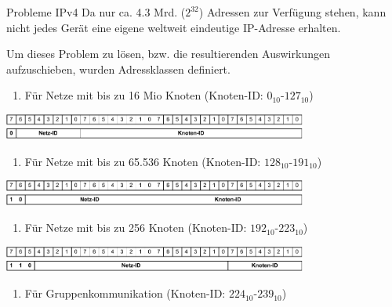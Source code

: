 \begin{bonus}{Probleme IPv4}
    Da nur ca. 4.3 Mrd. ($2^{32}$) Adressen zur Verfügung stehen, kann nicht jedes Gerät eine eigene weltweit eindeutige IP-Adresse erhalten.

    Um dieses Problem zu lösen, bzw. die resultierenden Auswirkungen aufzuschieben, wurden Adressklassen definiert.

    \begin{enumerate}[label=Class \Alph*:, leftmargin=*]
        \item Für Netze mit bis zu 16 Mio Knoten (Knoten-ID: $0_{10}\text{-}127_{10}$)
    \end{enumerate}

    \begin{center}
        \includegraphics[width=0.75\textwidth]{includes/figures/bonus_class_a.pdf}
    \end{center}

    \begin{enumerate}[label=Class \Alph*:, leftmargin=*, start=2]
        \item Für Netze mit bis zu 65.536 Knoten (Knoten-ID: $128_{10}\text{-}191_{10}$)
    \end{enumerate}

    \begin{center}
        \includegraphics[width=0.75\textwidth]{includes/figures/bonus_class_b.pdf}
    \end{center}

    \begin{enumerate}[label=Class \Alph*:, leftmargin=*, start=3]
        \item Für Netze mit bis zu 256 Knoten (Knoten-ID: $192_{10}\text{-}223_{10}$)
    \end{enumerate}

    \begin{center}
        \includegraphics[width=0.75\textwidth]{includes/figures/bonus_class_c.pdf}
    \end{center}

    \begin{enumerate}[label=Class \Alph*:, leftmargin=*, start=4]
        \item Für Gruppenkommunikation (Knoten-ID: $224_{10}\text{-}239_{10}$)
    \end{enumerate}


\end{bonus}
